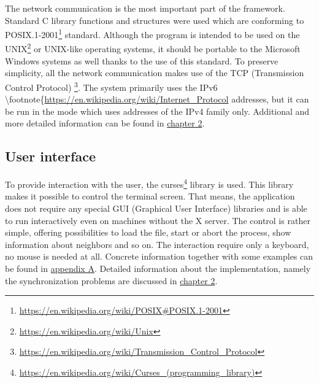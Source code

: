 The network communication is the most important part of the framework.
Standard C library functions and structures were used which are
conforming to
POSIX.1-2001\footnote{\url{https://en.wikipedia.org/wiki/POSIX\#POSIX.1-2001}}
standard. Although the program is intended to be used on the
UNIX\footnote{\url{https://en.wikipedia.org/wiki/Unix}} or UNIX-like
operating systems, it should be portable to the Microsoft Windows
systems as well thanks to the use of this standard. To preserve
simplicity, all the network communication makes use of the TCP
(Transmission Control Protocol)
\footnote{\url{https://en.wikipedia.org/wiki/Transmission\_Control\_Protocol}}.
The system primarily uses the IPv6
\textbackslash{}footnote\{\url{https://en.wikipedia.org/wiki/Internet\_Protocol}
addresses, but it can be run in the mode which uses addresses of the
IPv4 family only. Additional and more detailed information can be found
in \hyperref[implementation]{chapter 2}.

\subsection{User interface}\label{user-interface}

To provide interaction with the user, the
curses\footnote{\url{https://en.wikipedia.org/wiki/Curses\_(programming\_library)}}
library is used. This library makes it possible to control the terminal
screen. That means, the application does not require any special GUI
(Graphical User Interface) libraries and is able to run interactively
even on machines without the X server. The control is rather simple,
offering possibilities to load the file, start or abort the process,
show information about neighbors and so on. The interaction require only
a keyboard, no mouse is needed at all. Concrete information together
with some examples can be found in
\hyperref[installation-and-use]{appendix A}. Detailed information about
the implementation, namely the synchronization problems are discussed in
\hyperref[implementation]{chapter 2}.
